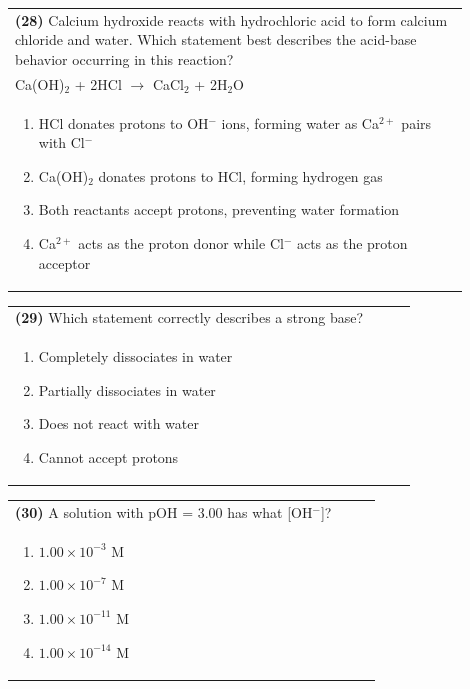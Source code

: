 \documentclass{article}
\begin{document}
\noindent\begin{tabular}{|p{0.9\linewidth}|}
\hline
\textbf{(28)} Calcium hydroxide reacts with hydrochloric acid to form calcium chloride and water. Which statement best describes the acid-base behavior occurring in this reaction?\\[0.2cm]
Ca(OH)$_2$ + 2HCl $\rightarrow$ CaCl$_2$ + 2H$_2$O\\[0.2cm]
\begin{minipage}[t]{0.85\linewidth}
\begin{enumerate}[label=\alph*.]
\item HCl donates protons to OH$^-$ ions, forming water as Ca$^{2+}$ pairs with Cl$^-$
\item Ca(OH)$_2$ donates protons to HCl, forming hydrogen gas
\item Both reactants accept protons, preventing water formation
\item Ca$^{2+}$ acts as the proton donor while Cl$^-$ acts as the proton acceptor
\end{enumerate}
\end{minipage}\\[0.2cm]
\hline
\end{tabular}
\newpage

\noindent\begin{tabular}{|p{0.9\linewidth}|}
\hline
\textbf{(29)} Which statement correctly describes a strong base? \\[0.2cm]
\begin{minipage}{0.85\linewidth}
\begin{enumerate}[label=\alph*.]
\item Completely dissociates in water \item Partially dissociates in water \item Does not react with water \item Cannot accept protons
\end{enumerate}
\end{minipage}\\[0.2cm]
\hline
\end{tabular}

\noindent\begin{tabular}{|p{0.9\linewidth}|}
\hline
\textbf{(30)} A solution with pOH = 3.00 has what [OH$^-$]? \\[0.2cm]
\begin{minipage}{0.85\linewidth}
\begin{enumerate}[label=\alph*.]
\item $1.00\times10^{-3}$ M \item $1.00\times10^{-7}$ M \item $1.00\times10^{-11}$ M \item $1.00\times10^{-14}$ M
\end{enumerate}
\end{minipage}\\[0.2cm]
\hline
\end{tabular}
\end{document}
